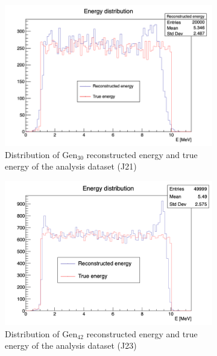 \documentclass[../main.tex]{subfiles}
\begin{document}
\begin{figure}[ht]
  \centering
  \begin{subfigure}[t]{0.48\linewidth}
    \includegraphics[width=\linewidth]{images/jcnn/vic_cnn/e_dis.png}
    \caption{Distribution of $\mathrm{Gen}_{30}$ reconstructed energy and true energy of the analysis dataset (J21)}
    \label{fig:jcnn:edis}
  \end{subfigure}
  \hfill
  \begin{subfigure}[t]{0.48\linewidth}
    \includegraphics[width=\linewidth]{images/jcnn/vic_cnn/e_dis_42.png}
    \caption{Distribution of $\mathrm{Gen}_{42}$ reconstructed energy and true energy of the analysis dataset (J23)}
    \label{fig:jcnn:edis42}
  \end{subfigure}
  \caption{}
\end{figure}
\end{document}

